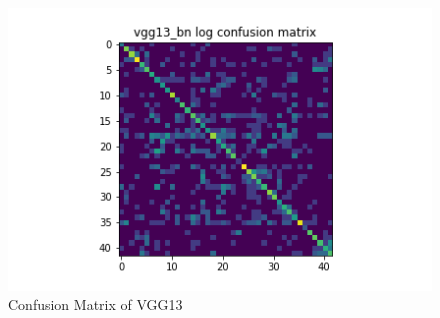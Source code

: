 \begin{figure}[t]
\begin{minipage}[b]{.5\linewidth}
  \end{minipage}
  \hfill
  \begin{minipage}[b]{.5\linewidth}
    \centering
    \includegraphics[width=1.2\textwidth]{figs/conf_matrix/vgg13_bn_log_conf.png}
  \end{minipage}

  \caption{Confusion Matrix of VGG13}
  \vspace{-3mm}
  \label{fig:vgg13_conf}
\end{figure}

